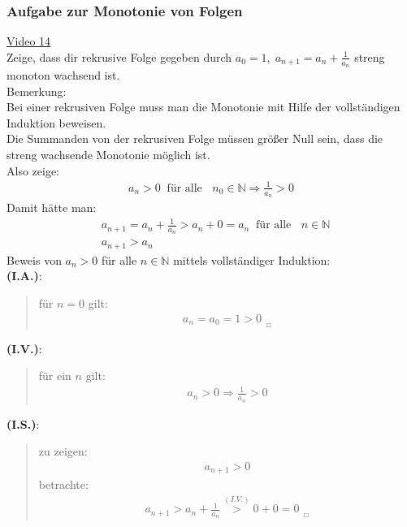 \subsubsection{Aufgabe zur Monotonie von Folgen}
\href{https://youtu.be/WSqcscE6Dhg}{Video 14}\\
Zeige, dass dir rekrusive Folge gegeben durch $a_0=1,\; a_{n+1}=a_n+\frac{1}{a_n} $ streng monoton wachsend ist.\vspace*{2mm}\\
Bemerkung:\\
Bei einer rekrusiven Folge muss man die Monotonie mit Hilfe der vollständigen Induktion beweisen.\\
Die Summanden von der rekrusiven Folge müssen größer Null sein, dass die streng wachsende Monotonie möglich ist.\\
Also zeige:\\
\begin{align*}
a_n>0 \;\;\text{für alle }\;\;n_0\in \mathbb{N}\Rightarrow \frac{1}{a_n}>0
\end{align*}
Damit hätte man:\\
\begin{align*}
&a_{n+1}=a_n+\frac{1}{a_n}>a_n+0=a_n \;\;\text{für alle }\;\;n\in \mathbb{N}\\
&a_{n+1}> a_n
\end{align*}
Beweis von $ a_n>0 $ für alle $ n\in\mathbb{N} $ mittels vollständiger Induktion:\\
\textbf{\textbullet \;\; (I.A.)}:\\
\begin{quote}
	für $ n=0 $ gilt:\\
	\begin{align*}
	a_n=a_0=1>0_{\;\;_{\Square}}
	\end{align*}
\end{quote}
\textbf{\textbullet \;\; (I.V.)}:\\
\begin{quote}
	für ein $ n $ gilt:\\
	\begin{align*}
	a_n>0 \Rightarrow \frac{1}{a_n}>0
	\end{align*}
\end{quote}
\textbf{\textbullet \;\;(I.S.)}:\\
\begin{quote}
	zu zeigen:\\
	\begin{align*}
	a_{n+1}>0
	\end{align*}
	betrachte:\\
	\begin{align*}
	a_{n+1}>a_n+\frac{1}{a_n}\overset{(I.V.)}{>}0+ 0=0_{\;\;_{\Square}}
	\end{align*}
\end{quote}
\newpage
\noindent
